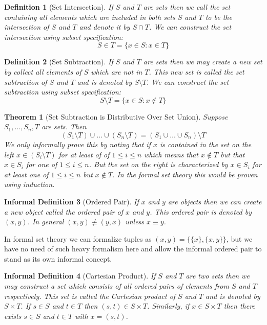 \documentclass[12pt]{article}
\theoremstyle{break}
\newtheorem{definition}{Definition}[section]
\theoremstyle{break}
\newtheorem{theorem}{Theorem}[section]
\theoremstyle{break}
\theoremstyle{break}
\theoremstyle{break}
\newtheorem{informal definition}[definition]{Informal Definition}
\begin{document}
\begin{definition}[Set Intersection]
If $S$ and $T$ are sets then we call the set containing all elements which are included in both sets $S$ and $T$ to be the intersection of $S$ and $T$ and denote it by $S\cap T$.
We can construct the set intersection using subset specification:
$$
S\in T = \{x\in S: x\in T\}
$$
\end{definition}

\begin{definition}[Set Subtraction]
If $S$ and $T$ are sets then we may create a new set by collect all elements of $S$ which are not in $T$.
This new set is called the set subtraction of $S$ and $T$ and is denoted by $S\setminus T$.
We can construct the set subtraction using subset specification:
$$
S\setminus T = \{x\in S: x \not \in T\}
$$
\end{definition}

\begin{theorem}[Set Subtraction is Distributive Over Set Union]
Suppose $S_1,\ldots, S_n, T$ are sets.
Then
$$
(S_1\setminus T)\cup \ldots \cup (S_n\setminus T) = (S_1\cup\ldots \cup S_n)\setminus T
$$
We only informally prove this by noting that if $x$ is contained in the set on the left $x\in (S_i\setminus T)$ for at least of of $1\le i \le n$ which means that $x\not \in T$ but that $x\in S_i$ for one of $1\le i \le n$.
But the set on the right is characterized by $x\in S_i$ for at least one of $1 \le i \le n$ but $x\not \in T$.
In the formal set theory this would be proven using induction.
\end{theorem}

\begin{informal definition}[Ordered Pair]
If $x$ and $y$ are objects then we can create a new object called the ordered pair of $x$ and $y$.
This ordered pair is denoted by $(x, y)$.
In general $(x, y) \not \equiv (y, x)$ unless $x\equiv y$.
\end{informal definition}
In formal set theory we can formalize tuples as $(x, y) = \{\{x\}, \{x, y\}\}$, but we have no need of such heavy formalism here and allow the informal ordered pair to stand as its own informal concept.

\begin{informal definition}[Cartesian Product]
If $S$ and $T$ are two sets then we may construct a set which consists of all ordered pairs of elements from $S$ and $T$ respectively.
This set is called the Cartesian product of $S$ and $T$ and is denoted by $S\times T$.
If $s\in S$ and $t\in T$ then $(s, t) \in S\times T$.
Similarly, if $x\in S\times T$ then there exists $s\in S$ and $t\in T$ with $x = (s, t)$.
\end{informal definition}
\end{document}
